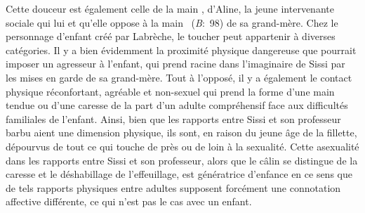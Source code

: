 Cette douceur est également celle de la main ,  d'Aline, la jeune intervenante sociale qui lui  et qu'elle oppose à la main ~(\textit{B}:~98) de sa grand-mère.
Chez le personnage d'enfant créé par Labrèche, le toucher peut appartenir à diverses catégories.
Il y a bien évidemment la proximité physique dangereuse que pourrait imposer un agresseur à l'enfant, qui prend racine dans l'imaginaire de Sissi par les mises en garde de sa grand-mère.
Tout à l'opposé, il y a également le contact physique réconfortant, agréable et non-sexuel qui prend la forme d'une main tendue ou d'une caresse de la part d'un adulte compréhensif face aux difficultés familiales de l'enfant.
Ainsi, bien que les rapports entre Sissi et son professeur barbu aient une dimension physique, ils sont, en raison du jeune âge de la fillette, dépourvus de tout ce qui touche de près ou de loin à la sexualité.
Cette asexualité dans les rapports entre Sissi et son professeur, alors que le câlin se distingue de la caresse et le déshabillage de l'effeuillage, est génératrice d'enfance en ce sens que de tels rapports physiques entre adultes supposent forcément une connotation affective différente, ce qui n'est pas le cas avec un enfant.


